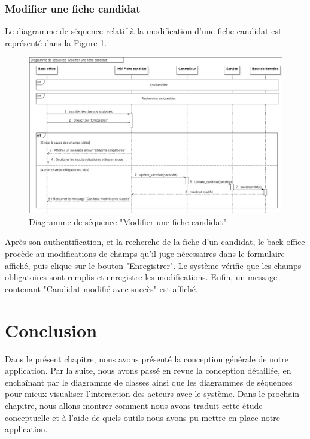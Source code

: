  \subsubsection{Modifier une fiche candidat}
 Le diagramme de séquence relatif à la modification d'une fiche candidat est représenté dans la Figure \ref{fig:sequence_modif_fiche}.
 \begin{figure}[H]
 \centering
 \includegraphics[scale=0.51]{img/sequence modifier fiche candidat.png}
 \caption{Diagramme de séquence "Modifier une fiche candidat"}
 \label{fig:sequence_modif_fiche}
 \end{figure}
 Après son authentification, et la recherche de la fiche d'un candidat, le back-office procède au modifications de champs qu'il juge nécessaires dans le formulaire affiché, puis clique sur le bouton "Enregistrer". Le système vérifie que les champs obligatoires sont remplis et enregistre les modifications. Enfin, un message contenant "Candidat modifié avec succès" est affiché.
\section*{Conclusion}
Dans le présent chapitre, nous avons présenté la conception générale de notre application. Par la suite, nous avons passé en revue la conception détaillée, en enchaînant par le diagramme de classes ainsi que les diagrammes de séquences pour mieux visualiser l'interaction des acteurs avec le système.
Dans le prochain chapitre, nous allons montrer comment nous avons traduit cette étude conceptuelle et à l’aide de quels outils nous avons pu mettre en place notre application.
